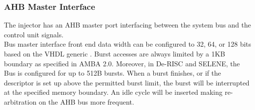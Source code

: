 \subsubsection{AHB Master Interface}
The injector has an AHB master port interfacing between the system bus and the control unit signals.\\
Bus master interface front end data width can be configured to 32, 64, or 128 bits based on the VHDL generic . 
Burst accesses are always limited by a 1KB boundary as specified in AMBA 2.0. Moreover, in De-RISC and SELENE, the Bus is configured for up to 512B bursts. 
When a burst finishes, or if the descriptor is set up above the permitted burst limit, the burst will be interrupted at the specified memory boundary. An idle cycle will be inserted making re-arbitration on the AHB bus more frequent.